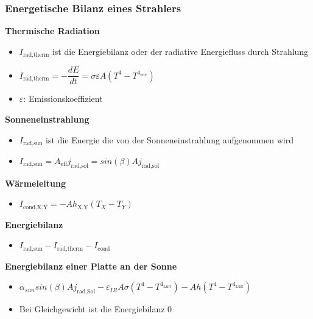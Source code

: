 \documentclass[8pt,a4paper]{scrartcl}
\begin{document}
\begin{multicols*}{3}
						\subsubsection{Energetische Bilanz eines Strahlers}
							\textbf{Thermische Radiation}
							\begin{itemize}\itemsep0pt
								\item $I_{\text{rad,therm}}$ ist die Energiebilanz oder der radiative Energiefluss durch Strahlung
								\item $I_{\text{rad,therm}} = - \dfrac{dE}{dt} = \sigma \varepsilon A(T^{4}-T^{4_{\text{env}}})$
								\item $\varepsilon$: Emissionskoeffizient
							\end{itemize}	
							
							\textbf{Sonneneinstrahlung}
							\begin{itemize}\itemsep0pt
								\item $I_{\text{rad,sun}}$ ist die Energie die von der Sonneneinstrahlung aufgenommen wird
								\item $I_{\text{rad,sun}} = A_{\text{eff}}j_{\text{rad,sol}}= sin(\beta)Aj_{\text{rad,sol}}$
							\end{itemize}
							
							\textbf{Wärmeleitung}
							\begin{itemize}\itemsep0pt
								\item $I_{\text{cond,X,Y}} = -Ah_{\text{X,Y}}(T_{X}-T_{Y})$
							\end{itemize}
							
							\textbf{Energiebilanz}
							\begin{itemize}\itemsep0pt
								\item $I_{\text{rad,sun}}-I_{\text{rad,therm}}-I_{\text{cond}}$
							\end{itemize}	
							
							\textbf{Energiebilanz einer Platte an der Sonne}
							\begin{itemize}\itemsep0pt
								\item $\alpha_{sun}sin(\beta)Aj_{\text{rad,Sol}}-\varepsilon_{IR}A\sigma(T^{4}-T^{4_{\text{Luft}}})-Ah(T^{4}-T^{4_{\text{Luft}}})$
								\item Bei Gleichgewicht ist die Energiebilanz 0
							\end{itemize}
							

\end{multicols*}
\end{document}
